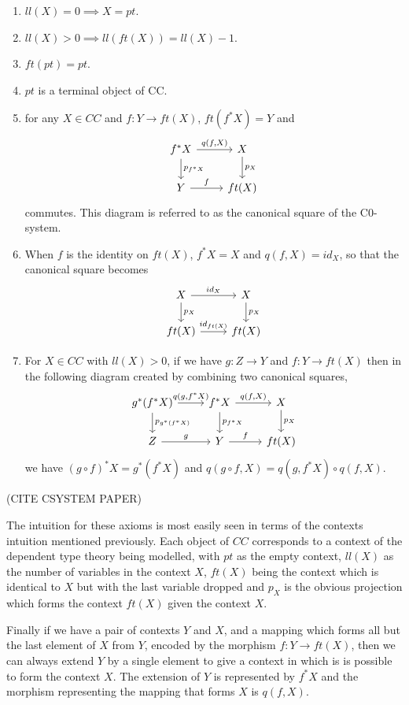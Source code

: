 \begin{enumerate}
    \item $ll(X) = 0 \implies X=pt$.
    \item $ll(X) > 0 \implies ll(ft(X)) = ll(X) - 1$.
    \item $ft(pt) = pt$.
    \item $pt$ is a terminal object of CC.
    \item for any $X\in CC$ and $f: Y\to ft(X)$, $ft(f^*X)=Y$ and
    \[
    \begin{tikzcd}
        f^*X\ar[r,"{q(f,X)}"]\ar[d,"p_{f^*X}"]&X\ar[d,"p_X"] \\
        Y\ar[r,"f"]&ft(X)
    \end{tikzcd}
    \]
    commutes. This diagram is referred to as the canonical square of the
    C0-system.
    \item When $f$ is the identity on $ft(X)$, $f^*X = X$ and $q(f, X) = id_X$,
    so that the canonical square becomes
    \[
    \begin{tikzcd}
        X\ar[r,"id_X"]\ar[d,"p_X"]&X\ar[d,"p_X"] \\
        ft(X)\ar[r,"id_{ft(X)}"]&ft(X)
    \end{tikzcd}
    \]
    \item For $X\in CC$ with $ll(X)>0$, if we have $g:Z\to Y$ and $f:Y\to ft(X)$
    then in the following diagram created by combining two canonical squares,
    \[
    \begin{tikzcd}
        g^*(f^*X)\ar[r,"{q(g, f^*X)}"]\ar[d,"p_{g^*(f^*X)}"]&
        f^*X\ar[r,"{q(f,X)}"]\ar[d,"p_{f^*X}"]&
        X\ar[d,"p_X"] \\
        Z\ar[r,"g"]&
        Y\ar[r,"f"]&
        ft(X)
    \end{tikzcd}
    \]
    we have $(g\circ f)^*X = g^*(f^*X)$ and $q(g\circ f, X) = q(g, f^*X)\circ
    q(f, X)$.
\end{enumerate}

(CITE CSYSTEM PAPER)

The intuition for these axioms is most easily seen in terms of the contexts
intuition mentioned previously. Each object of $CC$ corresponds to a context of
the dependent type theory being modelled, with $pt$ as the empty context,
$ll(X)$ as the number of variables in the context $X$, $ft(X)$ being the context
which is identical to $X$ but with the last variable dropped and $p_X$ is the
obvious projection which forms the context $ft(X)$ given the context $X$.

Finally if we have a pair of contexts $Y$ and $X$, and a mapping which forms all
but the last element of $X$ from $Y$, encoded by the morphism $f: Y\to ft(X)$,
then we can always extend $Y$ by a single element to give a context in which is
is possible to form the context $X$. The extension of $Y$ is represented by
$f^*X$ and the morphism representing the mapping that forms $X$ is $q(f, X)$.

